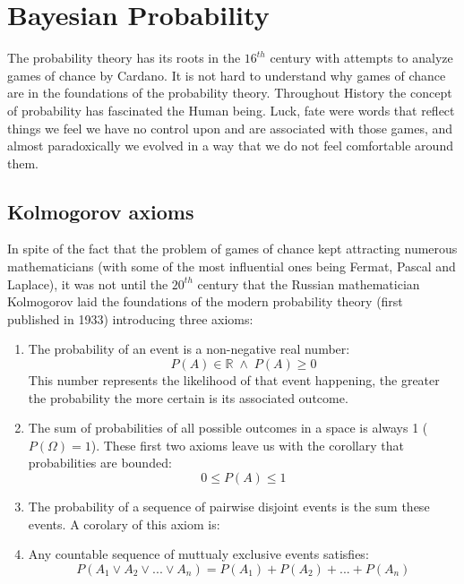 \section{Bayesian Probability}
\label{sec:int_bayesian_probability}

\label{subsec:int_int_bayesian_probability}

The probability theory has its roots in the $16^{th}$ century with attempts to analyze games of chance by Cardano. It is not hard to understand why games of chance are in the foundations of the probability theory. Throughout History the concept of probability has fascinated the Human being. Luck, fate were words that reflect things we feel we have no control upon and are associated with those games, and almost paradoxically we evolved in a way that we do not feel comfortable around them. 

\subsection{Kolmogorov axioms}

In spite of the fact that the problem of games of chance kept attracting numerous mathematicians (with some of the most influential ones being Fermat, Pascal and Laplace), it was not until the $20^{th}$ century that the Russian mathematician Kolmogorov laid the foundations of the modern probability theory (first published in 1933) introducing three axioms\cite{sep-probability-interpret}:

\begin{enumerate}
\item The probability of an event is a non-negative real number:
\begin{equation}
 P(A)\in\mathbb{R\;}\wedge\; P(A)\geq0
\end{equation}
This number represents the likelihood of that event happening, the greater the probability the more certain is its associated outcome. 
\item The sum of probabilities of all possible outcomes in a space is always 1 ($P(\Omega)=1$). These first two axioms leave us with the corollary that probabilities are bounded:
 \begin{equation}
0\leq P(A)\leq1
\end{equation}
\item The probability of a sequence of pairwise disjoint events is the sum these events. A corolary of this axiom is:
\item Any countable sequence of muttualy exclusive events satisfies:
\begin{equation}
P(A_{1}\vee A_{2} \vee ... \vee A_{n})=P(A_{1})+P(A_{2}) + ... + P(A_{n})
\end{equation}

\end{enumerate}

